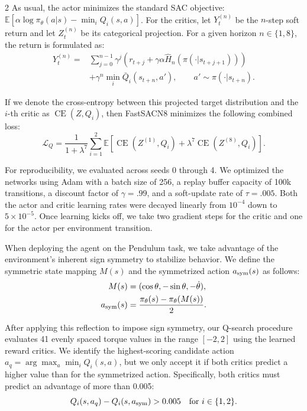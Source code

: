 \begin{multicols}{2}
As usual, the actor minimizes the standard SAC objective: $\mathbb E[\alpha\log\pi_\theta(a|s)-\min_iQ_i(s,a)]$. For the critics, let $Y_t^{(n)}$ be the $n$-step soft return and let $Z_t^{(n)}$ be its categorical projection. For a given horizon $n\in\{1,8\}$, the return is formulated as:
\[
\begin{aligned}
Y_t^{(n)}={}&\sum_{j=0}^{n-1}\gamma^j
\left(r_{t+j}+\gamma\alpha\widehat H_n(\pi(\cdot|s_{t+j+1}))\right)\\
&+\gamma^n\min_i\bar Q_i(s_{t+n},a'),\qquad a'\sim\pi(\cdot|s_{t+n}).
\end{aligned}
\]

If we denote the cross-entropy between this projected target distribution and the $i$-th critic as $\operatorname{CE}(Z,Q_i)$, then FastSACN8 minimizes the following combined loss:
\[
\mathcal L_Q=
\frac{1}{1+\lambda^7}
\sum_{i=1}^{2}\mathbb E\!\left[
\operatorname{CE}\!\left(Z^{(1)},Q_i\right)+
\lambda^7\operatorname{CE}\!\left(Z^{(8)},Q_i\right)
\right].
\]

For reproducibility, we evaluated across seeds 0 through 4. We optimized the networks using Adam with a batch size of 256, a replay buffer capacity of 100k transitions, a discount factor of $\gamma=.99$, and a soft-update rate of $\tau=.005$. Both the actor and critic learning rates were decayed linearly from $10^{-4}$ down to $5{\times}10^{-5}$. Once learning kicks off, we take two gradient steps for the critic and one for the actor per environment transition.

When deploying the agent on the Pendulum task, we take advantage of the environment's inherent sign symmetry to stabilize behavior. We define the symmetric state mapping $M(s)$ and the symmetrized action $a_{\rm sym}(s)$ as follows:
\[
\begin{aligned}
M(s)&=(\cos\theta,-\sin\theta,-\dot\theta),\\
a_{\rm sym}(s)&=\frac{\pi_\theta(s)-\pi_\theta(M(s))}{2}.
\end{aligned}
\]

After applying this reflection to impose sign symmetry, our Q-search procedure evaluates 41 evenly spaced torque values in the range $[-2,2]$ using the learned reward critics. We identify the highest-scoring candidate action $a_q=\arg\max_a\min_iQ_i(s,a)$, but we only accept it if both critics predict a higher value than for the symmetrized action. Specifically, both critics must predict an advantage of more than 0.005:
\[
Q_i(s,a_q)-Q_i(s,a_{\rm sym})>0.005
\quad\text{for }i\in\{1,2\}.
\]


\end{multicols}
